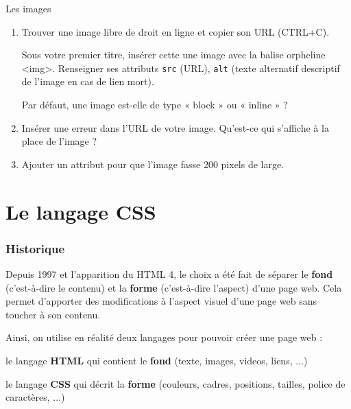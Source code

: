   \exer Les images
  
  \begin{enumerate}
  	\item     Trouver une image libre de droit en ligne et copier son URL (CTRL+C).
  	
    Sous votre premier titre, insérer cette une image avec la balise orpheline <img>. Renseigner ses attributs \verb+src+ (URL), \verb+alt+ (texte alternatif descriptif de l'image en cas de lien mort).
    
    Par défaut, une image est-elle de type « block » ou « inline » ? \dotfill
    \item Insérer une erreur dans l'URL de votre image. Qu'est-ce qui s'affiche à la place de l'image ?
    
    \dotfill
    \item Ajouter un attribut pour que l'image fasse 200 pixels de large.


  \end{enumerate}
  
  \newpage
  
  \section{Le langage CSS}
  
  
  \subsubsection{Historique}
  
   Depuis 1997 et l'apparition du HTML 4, le choix a été fait de séparer le \textbf{fond} (c'est-à-dire le contenu) et la \textbf{forme} (c'est-à-dire l'aspect) d'une page web. Cela permet d'apporter des modifications à l'aspect visuel d'une page web sans toucher à son contenu.
   
    Ainsi, on utilise en réalité deux langages pour pouvoir créer une page web : 
    
    \begin{liste}
    	\item le langage \textbf{HTML} qui contient le \textbf{fond} (texte, images, videos, liens, ...)
    	\item le langage \textbf{CSS} qui décrit la \textbf{forme} (couleurs, cadres, positions, tailles, police de caractères, ...)
    \end{liste}
    
    

\medskip

